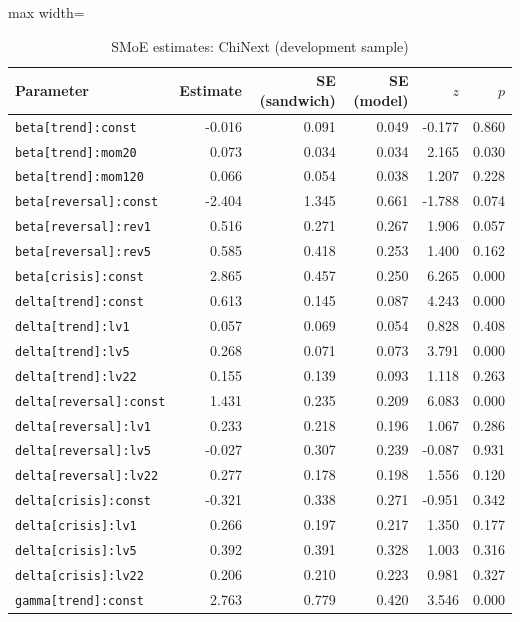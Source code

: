\begin{table}[!htbp]\centering\scriptsize
\caption{SMoE estimates: ChiNext (development sample)}\label{tab:params_chinext}
\begin{adjustbox}{max width=\textwidth}
\begin{tabular}{lrrrrr}
\toprule
Parameter & Estimate & SE (sandwich) & SE (model) & $z$ & $p$\\
\midrule
\texttt{beta[trend]:const} & -0.016 & 0.091 & 0.049 & -0.177 & 0.860\\
\texttt{beta[trend]:mom20} & 0.073 & 0.034 & 0.034 & 2.165 & 0.030\\
\texttt{beta[trend]:mom120} & 0.066 & 0.054 & 0.038 & 1.207 & 0.228\\
\texttt{beta[reversal]:const} & -2.404 & 1.345 & 0.661 & -1.788 & 0.074\\
\texttt{beta[reversal]:rev1} & 0.516 & 0.271 & 0.267 & 1.906 & 0.057\\
\texttt{beta[reversal]:rev5} & 0.585 & 0.418 & 0.253 & 1.400 & 0.162\\
\texttt{beta[crisis]:const} & 2.865 & 0.457 & 0.250 & 6.265 & 0.000\\
\texttt{delta[trend]:const} & 0.613 & 0.145 & 0.087 & 4.243 & 0.000\\
\texttt{delta[trend]:lv1} & 0.057 & 0.069 & 0.054 & 0.828 & 0.408\\
\texttt{delta[trend]:lv5} & 0.268 & 0.071 & 0.073 & 3.791 & 0.000\\
\texttt{delta[trend]:lv22} & 0.155 & 0.139 & 0.093 & 1.118 & 0.263\\
\texttt{delta[reversal]:const} & 1.431 & 0.235 & 0.209 & 6.083 & 0.000\\
\texttt{delta[reversal]:lv1} & 0.233 & 0.218 & 0.196 & 1.067 & 0.286\\
\texttt{delta[reversal]:lv5} & -0.027 & 0.307 & 0.239 & -0.087 & 0.931\\
\texttt{delta[reversal]:lv22} & 0.277 & 0.178 & 0.198 & 1.556 & 0.120\\
\texttt{delta[crisis]:const} & -0.321 & 0.338 & 0.271 & -0.951 & 0.342\\
\texttt{delta[crisis]:lv1} & 0.266 & 0.197 & 0.217 & 1.350 & 0.177\\
\texttt{delta[crisis]:lv5} & 0.392 & 0.391 & 0.328 & 1.003 & 0.316\\
\texttt{delta[crisis]:lv22} & 0.206 & 0.210 & 0.223 & 0.981 & 0.327\\
\texttt{gamma[trend]:const} & 2.763 & 0.779 & 0.420 & 3.546 & 0.000\\

\end{tabular}
\end{adjustbox}
\end{table}
